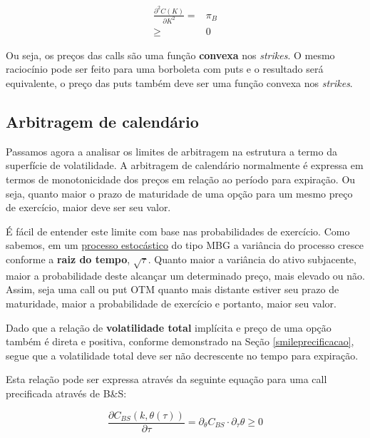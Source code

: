 \documentclass[]{book}
\theoremstyle{definition}
\theoremstyle{definition}
\theoremstyle{definition}
\theoremstyle{remark}
\begin{document}
\begin{equation}
\begin{aligned}
\frac{\partial^2 C(K)}{\partial K^2}=& \pi_B\\
\geq & 0
\end{aligned}
\label{eq:arbborboleta}
\end{equation}

Ou seja, os preços das calls são uma função \textbf{convexa} nos
\emph{strikes}. O mesmo raciocínio pode ser feito para uma borboleta com
puts e o resultado será equivalente, o preço das puts também deve ser
uma função convexa nos \emph{strikes}.

\subsection{Arbitragem de calendário}\label{arbitragem-de-calendario}

Passamos agora a analisar os limites de arbitragem na estrutura a termo
da superfície de volatilidade. A arbitragem de calendário normalmente é
expressa em termos de monotonicidade dos preços em relação ao período
para expiração. Ou seja, quanto maior o prazo de maturidade de uma opção
para um mesmo preço de exercício, maior deve ser seu valor.

É fácil de entender este limite com base nas probabilidades de
exercício. Como sabemos, em um
\protect\hyperlink{processos-estocasticos}{processo estocástico} do tipo
MBG a variância do processo cresce conforme a \textbf{raiz do tempo},
\(\sqrt{\tau}\). Quanto maior a variância do ativo subjacente, maior a
probabilidade deste alcançar um determinado preço, mais elevado ou não.
Assim, seja uma call ou put OTM quanto mais distante estiver seu prazo
de maturidade, maior a probabilidade de exercício e portanto, maior seu
valor.

Dado que a relação de \textbf{volatilidade total} implícita e preço de
uma opção também é direta e positiva, conforme demonstrado na Seção
\ref{smileprecificacao}, segue que a volatilidade total deve ser não
decrescente no tempo para expiração.

Esta relação pode ser expressa através da seguinte equação para uma call
precificada através de B\&S:

\begin{equation}
\frac{\partial C_{BS}(k, \theta(\tau))}{\partial \tau}=\partial_\theta C_{BS}\cdot\partial_\tau \theta \geq 0
\label{eq:arbcalendario}
\end{equation}
\end{document}
